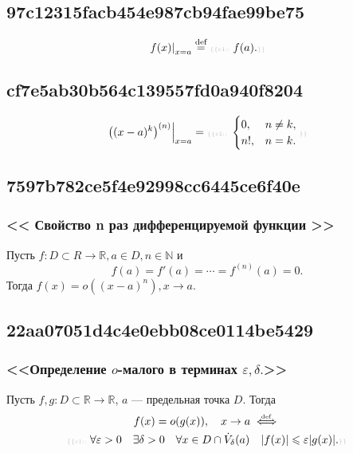 \documentclass[11pt, a5paper]{article}
\newenvironment{note}[1]{\goodbreak\par\subsection{\hfill \color{lightgray}\tiny #1}}{}
\newenvironment{icloze}[2][\ldots]{%
  \ignorespaces\text{\tiny \color{lightgray} \{\{c#2:: }%
}{%
  \text{\tiny \color{lightgray}\}\}}\unskip%
}
\begin{document}
\begin{note}{97c12315facb454e987cb94fae99be75}
\[
    \left. f(x) \right|_{x = a} \overset{\text{def}}= \begin{icloze}{1}f(a).\end{icloze}
\]
\end{note}

\begin{note}{cf7e5ab30b564c139557fd0a940f8204}
    \[
        \left. \left((x - a)^{k} \right)^{(n)}  \right|_{x = a} =
        \begin{icloze}{1}
            \begin{cases}
                0, & n \neq k, \\
                n!, & n = k.
            \end{cases}
        \end{icloze}
    \]
\end{note}

\begin{note}{7597b782ce5f4e92998cc6445ce6f40e}
    \subsubsection{<<\begin{icloze}{3}Свойство n раз дифференцируемой функции\end{icloze}>>}

    Пусть \begin{icloze}{2}\( f : D \subset R \to \mathbb R, a \in D, n \in \mathbb N \) и \[
        f(a) = f'(a) = \cdots = f^{(n)} (a) = 0.
    \]\end{icloze}
    Тогда \begin{icloze}{1}\( f(x) = o((x - a)^{n} ),  x \to a \).\end{icloze}
\end{note}

\begin{note}{22aa07051d4c4e0ebb08ce0114be5429}
    \subsubsection{<<Определение \( o \)-малого в терминах \( \varepsilon, \delta. \)>>}

    Пусть \( f, g : D \subset \mathbb R \to \mathbb R \), \( a \) --- предельная точка \( D \). Тогда
    \begin{multline*}
        f(x) = o(g(x)), \quad x \to a \overset{\hspace{-1pt}\text{\tiny def}}\iff \\
        \begin{icloze}{1}
            \forall \varepsilon > 0 \quad \exists \delta > 0 \quad \forall x \in D \cap \dot V_{\delta}(a) \quad |f(x)| \leqslant \varepsilon |g(x)|.
        \end{icloze}
    \end{multline*}
\end{note}
\end{document}
